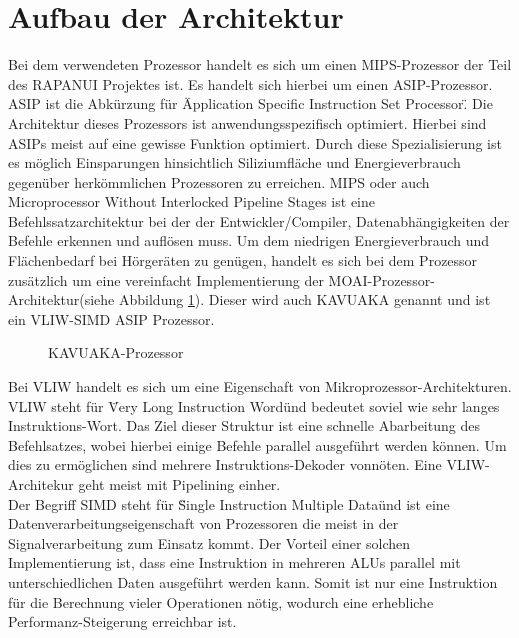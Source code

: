 \section{Aufbau der Architektur}
\label{chap:architecture_overview}
Bei dem verwendeten Prozessor handelt es sich um einen MIPS-Prozessor der Teil des RAPANUI Projektes ist. Es handelt sich hierbei um einen ASIP-Prozessor. ASIP ist die Abkürzung für \"Application Specific Instruction Set Processor\". Die Architektur dieses Prozessors ist anwendungsspezifisch optimiert. Hierbei sind ASIPs meist auf eine gewisse Funktion optimiert. Durch diese Spezialisierung ist es möglich Einsparungen hinsichtlich Siliziumfläche und Energieverbrauch gegenüber herkömmlichen Prozessoren zu erreichen. MIPS oder auch \glqq Microprocessor Without Interlocked Pipeline Stages\grqq{} ist eine Befehlssatzarchitektur bei der der Entwickler/Compiler, Datenabhängigkeiten der Befehle erkennen und auflösen muss.
Um dem niedrigen Energieverbrauch und Flächenbedarf bei Hörgeräten zu genügen, handelt es sich bei dem Prozessor zusätzlich um eine vereinfacht Implementierung der MOAI-Prozessor-Architektur(siehe Abbildung \ref{fig:KAVUAKA}). Dieser wird auch KAVUAKA genannt und ist ein VLIW-SIMD ASIP Prozessor.\\
	\begin{figure}[H] 
		\centering
		
		\caption[KAVUAKA-Prozessor]{KAVUAKA-Prozessor \cite{lukasglitches2017}}
		\label{fig:KAVUAKA}
	\end{figure}
Bei VLIW  handelt es sich um eine Eigenschaft von Mikroprozessor-Architekturen. VLIW steht für \"Very Long Instruction Word\" und bedeutet soviel wie sehr langes Instruktions-Wort. Das Ziel dieser Struktur ist eine schnelle Abarbeitung des Befehlsatzes, wobei hierbei einige Befehle parallel ausgeführt werden können. Um dies zu ermöglichen sind mehrere Instruktions-Dekoder vonnöten. Eine VLIW-Architekur geht meist mit Pipelining einher.\\
Der Begriff SIMD steht für \"Single Instruction Multiple Data\" und ist eine Datenverarbeitungseigenschaft von Prozessoren die meist in der Signalverarbeitung zum Einsatz kommt. Der Vorteil einer solchen Implementierung ist, dass eine Instruktion in mehreren ALUs parallel mit unterschiedlichen Daten ausgeführt werden kann. Somit ist nur eine Instruktion für die Berechnung vieler Operationen nötig, wodurch eine erhebliche Performanz-Steigerung erreichbar ist.\cite[Seite 249]{wust2010mikroprozessortechnik}\\
